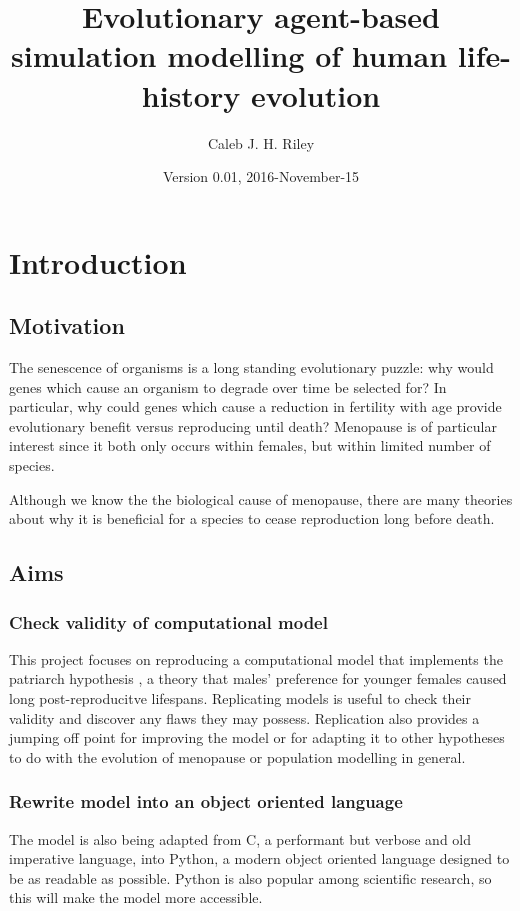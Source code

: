 \documentclass[authoryearcitations]{UoYCSproject}
\author{Caleb J. H. Riley}
\title{Evolutionary agent-based simulation modelling of human life-history evolution}
\date{Version 0.01, 2016-November-15}
\begin{document}
\maketitle
\listoffigures
\listoftables

\cleardoublepage

\chapter{Introduction}
\label{cha:Introduction}
\section{Motivation}
The senescence of organisms is a long standing evolutionary puzzle: why would genes which cause an organism to degrade over time be selected for? In particular, why could genes which cause a reduction in fertility with age provide evolutionary benefit versus reproducing until death? Menopause is of particular interest since it both only occurs within females, but within limited number of species.

Although we know the the biological cause of menopause, there are many theories about why it is beneficial for a species to cease reproduction long before death. 


\section{Aims}
\subsection{Check validity of computational model}
This project focuses on reproducing a computational model \cite{mateChoice2013} that implements the patriarch hypothesis \cite{patriarchHypothesis2000}, a theory that males' preference for younger females caused long post-reproducitve lifespans. Replicating models is useful to check their validity and discover any flaws they may possess. Replication also provides a jumping off point for improving the model or for adapting it to other hypotheses to do with the evolution of menopause or population modelling in general. 

\subsection{Rewrite model into an object oriented language}
The model is also being adapted from C, a performant but verbose and old imperative language, into Python, a modern object oriented language designed to be as readable as possible. Python is also popular among scientific research, so this will make the model more accessible.
\end{document}
